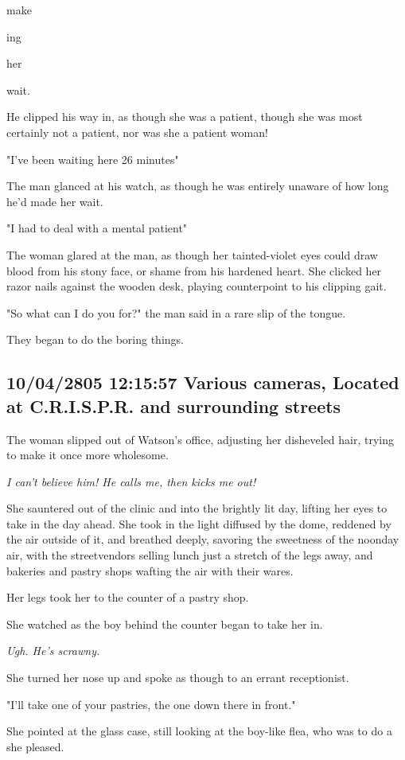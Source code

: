 \documentclass[12pt]{article}
\begin{document}
make

ing

her

wait.

He clipped his way in, as though she was a patient, though she was most certainly not a patient, nor was she a patient woman!

"I've been waiting here 26 minutes"

The man glanced at his watch, as though he was entirely unaware of how long he'd made her wait.

"I had to deal with a mental patient"

The woman glared at the man, as though her tainted-violet eyes could draw blood from his stony face, or shame from his hardened heart. She clicked her razor nails against the wooden desk, playing counterpoint to his clipping gait.

"So what can I do you for?" the man said in a rare slip of the tongue.

They began to do the boring things.

\subsection*{10/04/2805 12:15:57 Various cameras, Located at C.R.I.S.P.R. and surrounding streets}
\label{sec:org1c946da}

The woman slipped out of Watson's office, adjusting her disheveled hair, trying to make it once more wholesome.

\emph{I can't believe him! He calls me, then kicks me out!}

She sauntered out of the clinic and into the brightly lit day, lifting her eyes to take in the day ahead. She took in the light diffused by the dome, reddened by the air outside of it, and breathed deeply, savoring the sweetness of the noonday air, with the streetvendors selling lunch just a stretch of the legs away, and bakeries and pastry shops wafting the air with their wares.

Her legs took her to the counter of a pastry shop.

She watched as the boy behind the counter began to take her in.

\emph{Ugh. He's scrawny.}

She turned her nose up and spoke as though to an errant receptionist.

"I'll take one of your pastries, the one down there in front."

She pointed at the glass case, still looking at the boy-like flea, who was to do a she pleased.
\end{document}
